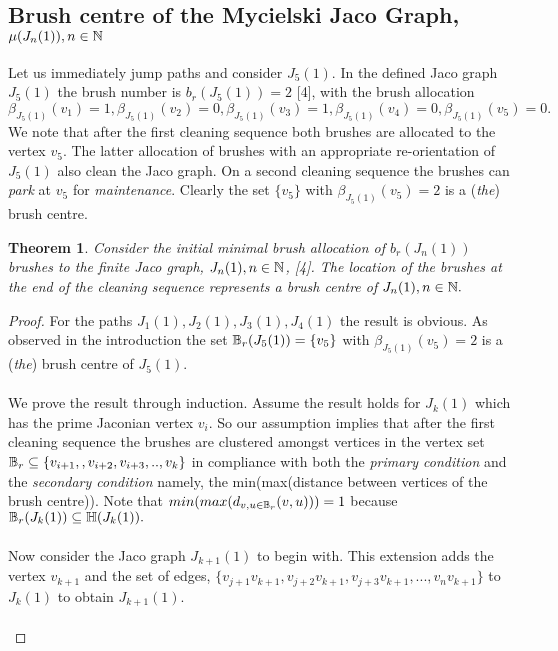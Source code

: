 \documentclass[11pt]{article}
\numberwithin{equation}{section}
\newtheorem{theorem}{Theorem}[section]
\begin{document}
{\subsection{Brush centre of the Mycielski Jaco Graph, $\mu(J_n(1)), n \in \Bbb N$}
Let us immediately jump paths and consider $J_5(1)$. In the defined Jaco graph $J_5(1)$ the brush number is $b_r(J_5(1)) = 2$ [4], with the brush allocation $\beta_{J_5(1)}(v_1) =1, \beta_{J_5(1)}(v_2) = 0, \beta_{J_5(1)}(v_3) =1, \beta_{J_5(1)}(v_4) = 0, \beta_{J_5(1)}(v_5) = 0.$ We note that after the first cleaning sequence both brushes are allocated to the vertex $v_5$. The latter allocation of brushes with an appropriate re-orientation of $J_5(1)$ also clean the Jaco graph. On a second cleaning sequence the brushes can \emph{park} at $ v_5$ for \emph{maintenance}. Clearly the set $\{v_5\}$ with $\beta_{J_5(1)}(v_5) =2$ is a (\emph{the}) brush centre.
\begin{theorem}
Consider the initial minimal brush allocation of $b_r(J_n(1))$ brushes to the finite Jaco graph, $J_n(1), n \in \Bbb N$, [4]. The location of the brushes at the end of the cleaning sequence represents a brush centre of $J_n(1), n \in \Bbb N.$ 
\end{theorem}
\begin{proof}
For the paths $J_1(1), J_2(1), J_3(1), J_4(1)$ the result is obvious. As observed in the introduction the set $\Bbb B_r(J_5(1)) =\{v_5\}$ with $\beta_{J_5(1)}(v_5) =2$ is a (\emph{the}) brush centre of $J_5(1)$.\\ \\
We prove the result through induction. Assume the result holds for $J_k(1)$ which has the prime Jaconian vertex $v_i$. So our assumption implies that after the first cleaning sequence the brushes are clustered amongst vertices in the vertex set $\Bbb B_r \subseteq \{v_{i+1},, v_{i+2}, v_{i+3}, .., v_k\}$ in compliance with both the \emph{primary condition} and the \emph{secondary condition} namely, the min(max(distance between vertices of the brush centre)). Note that $min(max(d_{v,u \in \Bbb B_r}(v,u))) = 1$ because $\Bbb B_r(J_k(1)) \subseteq \Bbb H(J_k(1)).$\\ \\
Now consider the Jaco graph $J_{k+1}(1)$ to begin with. This extension adds the vertex $v_{k+1}$ and the set of edges, $\{v_{j+1}v_{k+1}, v_{j+2}v_{k+1}, v_{j+3}v_{k+1}, ..., v_nv_{k+1}\}$ to $J_k(1)$ to obtain $J_{k+1}(1).$\\ \\

\end{proof}}
\end{document}

